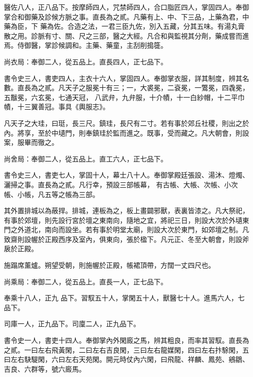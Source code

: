 \begin{pinyinscope}
 醫佐八人，正八品下。按摩師四人，咒禁師四人，合口脂匠四人，掌固四人。奉御掌合和御藥及診候方脈之事。直長為之貳。凡藥有上、中、下三品，上藥為君，中藥為臣，下
 藥為佐。合造之法，一君三臣九佐，別入五藏，分其五味。有湯丸膏散之用。診脈有寸、關、尺之三部，醫之大經。凡合和與監視其分劑，藥成嘗而進焉。侍御醫，掌診候調和。主藥、藥童，主刮削搗簁。



 尚衣局：奉御二人，從五品上。直長四人，正七品下。



 書令史三人，書吏四人，主衣十六人，掌固四人。奉御掌衣服，詳其制度，辨其名數。直長為之貳。凡天子之服冕十有三；一，大裘冕，二袞冕，一鷩冕，四毳冕，五黻冕，六玄冕，七通天冠，
 八武弁，九弁服，十介幘，十一白紗帽，十二平巾幘，十三翼善冠。事具《輿服志》。



 凡天子之大珪，曰珽，長三尺。鎮珪，長尺有二寸。若有事於郊丘社稷，則出之於內。將享，至於中壝門，則奉鎮珪於監而進之。既事，受而藏之。凡大朝會，則設案，服畢而徹之。



 尚舍局：奉御二人，從五品上。直工六人，正七品下。



 書令史三人，書吏七人，掌固十人，幕士八十人。奉御掌殿廷張設、湯沐、燈燭、灑掃之事。直長為之貳。凡行幸，預設三部帳幕，
 有古帳、大帳、次帳、小次帳、小帳，凡五等之帳為三部。



 其外置排城以為蔽捍。排城，連板為之，板上畫闢邪獸，表裏皆漆之。凡大祭祀，有事於郊壇，則先設行宮於壇之東南向，隨地之宜，將祀三日，則設大次於外壝東門之外道北，南向而設坐。若有事於明堂太廟，則設大次於東門，如郊壇之制。凡致齋則設幄於正殿西序及室內，俱東向，張於楹下。凡元正、冬至大朝會，則設斧扆於正殿。



 施蹋席薰爐。朔望受朝，則施幄於正殿，帳裙頂帶，方闊一丈四尺也。



 尚乘局：奉御二人，從五品上。直長一人，正七品下。



 奉乘十八人，正九
 品下。習馭五十人，掌閑五十人，獸醫七十人。進馬六人，七品下。



 司庫一人，正九品下。司廩二人，正九品下。



 書令史一人，書吏十四人。奉御掌內外閑廄之馬，辨其粗良，而率其習馭。直長為之貳。一曰左右飛黃閑，二曰左右吉良閑，三曰左右龍媒閑，四曰左右抃駼閑，五曰左右駃騠閑，六曰左右天苑閑。開元時仗內六閑，曰飛龍、祥麟、鳳苑、鵷鶵、吉良、六群等，號六廄馬。




\end{pinyinscope}
